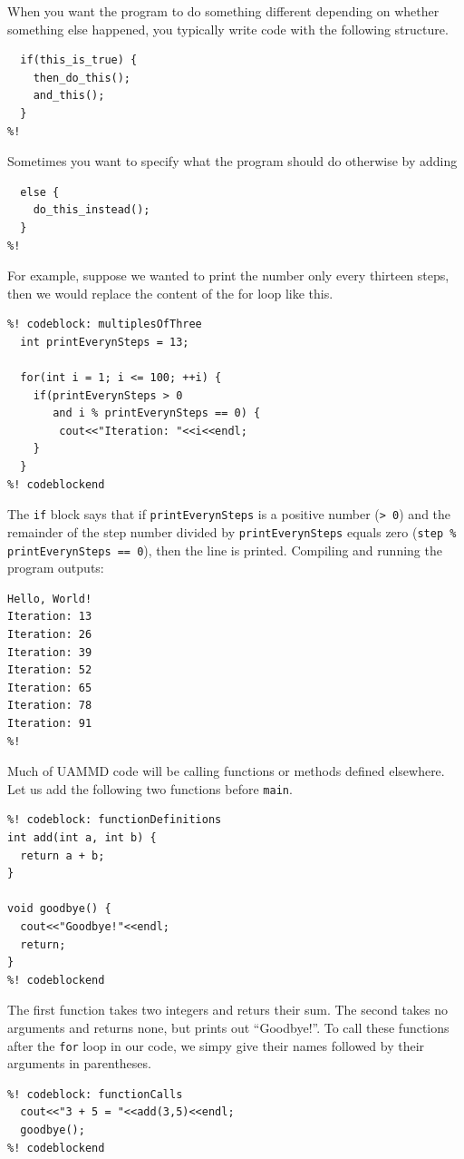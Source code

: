 When you want the program to do something different depending on whether 
something else happened, you typically write code with the following structure.
\begin{lstlisting}
  if(this_is_true) {
    then_do_this();
    and_this();
  }
%!
\end{lstlisting}
Sometimes you want to specify what the program should do otherwise by adding
\begin{lstlisting}
  else {
    do_this_instead();
  }
%!
\end{lstlisting}
For example, suppose we wanted to print the number only every thirteen steps,
then we would replace the content of the for loop like this.
\begin{lstlisting}
%! codeblock: multiplesOfThree
  int printEverynSteps = 13;

  for(int i = 1; i <= 100; ++i) {
    if(printEverynSteps > 0
       and i % printEverynSteps == 0) {
        cout<<"Iteration: "<<i<<endl;
    }
  }
%! codeblockend
\end{lstlisting}
The \texttt{if} block says that if \texttt{printEverynSteps} is a positive 
number (\texttt{> 0}) and the remainder of the step number divided by 
\texttt{printEverynSteps} equals zero (\texttt{step \% printEverynSteps == 0}), 
then the line is printed. Compiling and running the program outputs:
\begin{lstlisting}
Hello, World!
Iteration: 13
Iteration: 26
Iteration: 39
Iteration: 52
Iteration: 65
Iteration: 78
Iteration: 91
%!
\end{lstlisting}

Much of UAMMD code will be calling functions or methods defined elsewhere.
Let us add the following two functions before \texttt{main}.
\begin{lstlisting}
%! codeblock: functionDefinitions
int add(int a, int b) {
  return a + b;
}

void goodbye() {
  cout<<"Goodbye!"<<endl;
  return;
}
%! codeblockend
\end{lstlisting}
The first function takes two integers and returs their sum. The second takes no
arguments and returns none, but prints out ``Goodbye!''. To call these functions
after the \texttt{for} loop in our code, we simpy give their names followed by
their arguments in parentheses.
\begin{lstlisting}
%! codeblock: functionCalls
  cout<<"3 + 5 = "<<add(3,5)<<endl;
  goodbye();
%! codeblockend
\end{lstlisting}


